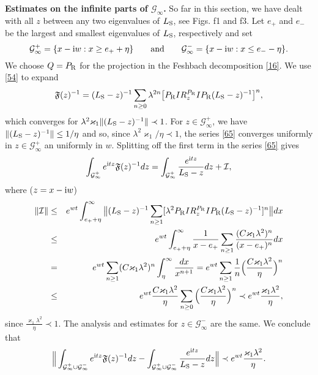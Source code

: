 \documentclass[letterpaper,onecolumn,11pt,accepted=2021-12-09]{quantumarticle}
\numberwithin{equation}{section}
\renewcommand{\r}{{\rm R}}
\newcommand{\s}{{\rm S}}
\renewcommand{\i}{{\rm i}}
\begin{document}
\noindent
{\bf Estimates on the infinite parts of ${\mathcal G}_\infty$.} So far in this section, we have dealt with all $z$ between any two eigenvalues of $L_\s$, see Figs. f1 and f3. Let $e_+$  and $e_-$ be the largest and smallest eigenvalues of $L_\s$, respectively and set 
\begin{equation}
{\mathcal G}_\infty^+ = \{x-\i w : x\ge e_++\eta \}\qquad\mbox{and}\qquad {\mathcal G}_\infty^- = \{x-\i w : x\le e_--\eta\}.
\end{equation} 
We choose $Q=P_\r$ for the projection in the Feshbach decomposition \eqref{16}. We use \eqref{54} to expand 
\begin{equation}
	\label{65}
	{\mathfrak F}(z)^{-1}= (L_\s-z)^{-1} \sum_{n\ge 0}\lambda^{2n} \big[P_\r IR_z^{P_\r}I P_\r(L_\s-z)^{-1}\big]^n,
\end{equation}
which converges for $\lambda^2\varkappa_1\|(L_\s-z)^{-1}\|\prec 1$. For $z\in{\mathcal G}_\infty^+$, we have $\|(L_\s-z)^{-1}\| \le 1/\eta$ and so, since $\lambda^2\varkappa_1/\eta\prec 1$, the series \eqref{65} converges uniformly in $z\in{\mathcal G}_\infty^+$ an uniformly in $w$. Splitting off the first term in the series \eqref{65} gives 
\begin{equation}
\label{64}
\int_{{\mathcal G}_\infty^+}e^{\i t z} {\mathfrak F}(z)^{-1} dz  =\int_{{\mathcal G}_\infty^+}\frac{e^{\i t z}}{L_\s-z}dz +{\mathcal I},
\end{equation}
where ($z=x-\i w$)
\begin{eqnarray}
\|{\mathcal I}\| &\le& e^{wt} \int_{e_++\eta}^\infty \big\| (L_\s-z)^{-1} \sum_{n\ge 1}  [\lambda^2 P_\r IR_z^{P_\r}IP_\r(L_\s-z)^{-1}]^n \big\| dx \nonumber\\
&\le & e^{wt} \int_{e_++\eta}^\infty \frac{1}{x-e_+}  \sum_{n\ge 1}
\frac{(C \varkappa_1\lambda^2)^n}{(x-e_+)^n}  dx \nonumber\\
&=& e^{wt}\sum_{n\ge 1} (C \varkappa_1\lambda^2)^n \int_\eta^\infty \frac{dx}{x^{n+1}} = e^{wt} \sum_{n\ge1}\frac{1}{n}\Big( \frac{C\varkappa_1\lambda^2}{\eta}\Big)^n \nonumber\\
&\le& e^{wt} \frac{C\varkappa_1\lambda^2}{\eta}\sum_{n\ge0} \Big( \frac{C\varkappa_1\lambda^2}{\eta}\Big)^n\prec e^{wt} \frac{\varkappa_1\lambda^2}{\eta}, 
\label{139}
\end{eqnarray}
since $\frac{\varkappa_1\lambda^2}{\eta}\prec 1$. The analysis and estimates for $z\in{\mathcal G}_\infty^-$  are the same. 
We conclude that 
\begin{equation}
	\Big\|
\int_{{\mathcal G}_\infty^+\cup {\mathcal G}_\infty^-} e^{\i t z} {\mathfrak F}(z)^{-1} dz  -\int_{{\mathcal G}_\infty^+\cup {\mathcal G}_\infty^-}\frac{e^{\i t z}}{L_\s-z}dz \Big\| \prec
 e^{wt} \frac{\varkappa_1\lambda^2}{\eta}. 
\label{67}
\end{equation}
\end{document}
